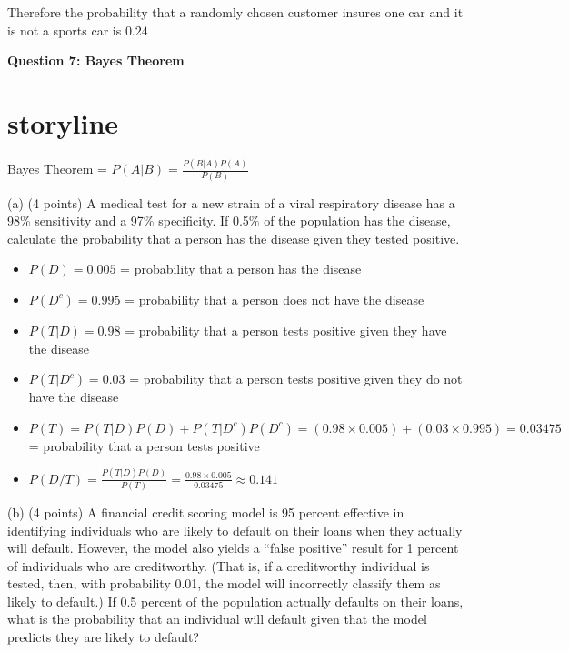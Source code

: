 \documentclass{article}
\begin{document}
Therefore the probability that a randomly chosen customer insures one car and it is not a sports car is \(\mathbf{0.24}\)

\begin{center}
    \large \textbf{Question 7: Bayes Theorem}
\end{center}

\section{storyline}

Bayes Theorem = \(P(A|B) = \frac{P(B|A)P(A)}{P(B)}\)

(a) (4 points) A medical test for a new strain of a viral respiratory disease has a 98\% sensitivity and
a 97\% specificity. If 0.5\% of the population has the disease, calculate the probability that a person
has the disease given they tested positive.

\begin{itemize}
    \item \(P(D) = 0.005\) = probability that a person has the disease
    \item \(P(D^c) = 0.995\) = probability that a person does not have the disease
    \item \(P(T|D) = 0.98\) = probability that a person tests positive given they have the disease
    \item \(P(T|D^c) = 0.03\) = probability that a person tests positive given they do not have the disease
    \item \(P(T) = P(T|D)P(D) + P(T|D^c)P(D^c) = (0.98 \times 0.005) + (0.03 \times 0.995) = 0.03475\) = probability that a person tests positive
    \item \(P(D/T) = \frac{P(T|D)P(D)}{P(T)} = \frac{0.98 \times 0.005}{0.03475} \approx 0.141\)
\end{itemize}


(b) (4 points) A financial credit scoring model is 95 percent effective in identifying individuals who
are likely to default on their loans when they actually will default. However, the model also yields a
“false positive” result for 1 percent of individuals who are creditworthy. (That is, if a creditworthy
individual is tested, then, with probability 0.01, the model will incorrectly classify them as likely
to default.) If 0.5 percent of the population actually defaults on their loans, what is the probability
that an individual will default given that the model predicts they are likely to default?
\end{document}
